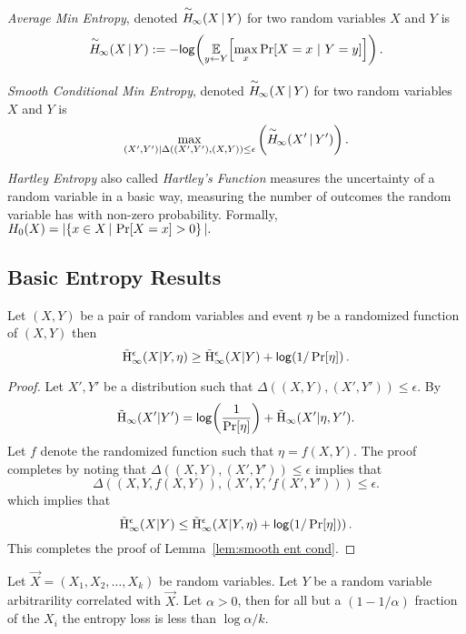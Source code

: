 \begin{definition}
    \emph{Average Min Entropy}, denoted $\overset{\sim}{H}\!_{\infty}\!\left(X\,|\,Y\right)$ for two random variables $X$ and $Y$ is \[ \overset{\sim}{H}\!_{\infty}\!\left(X\,|\,Y\right) := -\mathsf{log}\!\left(\operatorname*{\mathbb{E}}\limits_{y \leftarrow Y}\!\left[\max\limits_{x} \Pr\!\left[X = x\ |\ Y = y\right]\right]\right).\] 
\end{definition}

\begin{definition}
    \emph{Smooth Conditional Min Entropy}, denoted $\overset{\sim}{H}\!_{\infty}\!\left(X\,|\,Y\right)$ for two random variables $X$ and $Y$ is \[\max_{(X',Y') | \Delta((X', Y'), (X, Y))\le \epsilon} \left( \overset{\sim}{H}\!_{\infty}\!\left(X'\,|\,Y'\right)\right).
    \] 
\end{definition}


\begin{definition}
    \emph{Hartley Entropy} also called \emph{Hartley's Function} measures the uncertainty of a random variable in a basic way, measuring the number of outcomes the random variable has with non-zero probability. Formally, $
    H_0\!\left(X\right) = | \!\left\{ x \in X\,|\, \Pr\!\left[X = x\right] > 0 \right\}|.
    $
\end{definition}

\subsection{Basic Entropy Results}
\begin{lemma}
Let $(X, Y)$ be a pair of random variables and event $\eta$ be a randomized function of $(X, Y)$ then 
\[
\tilde{\mathrm{H}}_\infty^\epsilon(X|Y, \eta)\ge \tilde{\mathrm{H}}_\infty^\epsilon(X|Y) + \mathsf{log}\!\left( 1/\Pr[\eta]\right).
\]
\label{lem:smooth ent cond}
\end{lemma}
\begin{proof}
Let $X', Y'$ be a distribution such that $\Delta((X, Y), (X', Y')) \le \epsilon$.  By \cite[Lemma 7.8]{fuller2020fuzzy} 
\begin{align*}
\tilde{\mathrm{H}}_\infty(X' | Y') =\mathsf{log}\!\left(\frac{1}{\Pr[\eta]}\right)+\tilde{\mathrm{H}}_\infty(X'| \eta, Y').
\end{align*}
Let $f$ denote the randomized function such that $\eta = f(X, Y)$.    
The proof completes by noting that $\Delta((X, Y), (X', Y'))\le \epsilon$ implies that 
\[
\Delta((X, Y, f(X, Y)), (X', Y,' f(X', Y')))\le \epsilon.\]  which implies that 
\[
\tilde{\mathrm{H}}_\infty^\epsilon(X| Y) \le \tilde{\mathrm{H}}_\infty^\epsilon(X|Y, \eta) +\mathsf{log}\!\left(1/\Pr[\eta])\right).
\]
This completes the proof of Lemma~\ref{lem:smooth ent cond}.
\end{proof}


\begin{lemma}{\cite[Lemma 2.2a]{dodis2008fuzzy}}
    \label{lem:markovpred}
    Let $\vec{X} = (X_1, X_2, \ldots, X_k)$ be random variables. Let $Y$ be a random variable arbitrarility correlated with $\vec{X}$. 
    Let $\alpha > 0$, then for all but a $(1-1/\alpha)$ fraction of the $X_i$ the entropy loss is less than $\log{\alpha}/k$. 
\end{lemma}

